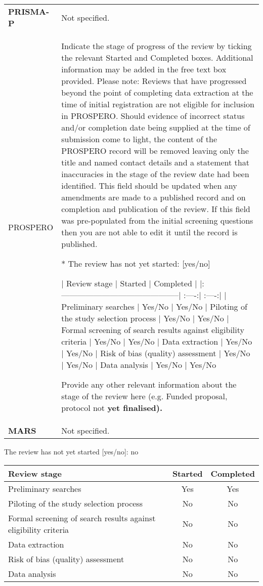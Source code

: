 \documentclass[
]{article}
\begin{document}
\hypertarget{sor}{}
\begin{collapse}

\begin{table}[H]
\centering
\begin{tabular}{>{}l|l}
\hline
\cellcolor[HTML]{ececec}{source} & \cellcolor[HTML]{ececec}{description}\\
\hline
\textbf{PRISMA-P} & Not specified.\\
\hline
PROSPERO & Indicate the stage of progress of the review by ticking the relevant Started and Completed boxes. Additional
information may be added in the free text box provided.
Please note: Reviews that have progressed beyond the point of completing data extraction at the time of
initial registration are not eligible for inclusion in PROSPERO. Should evidence of incorrect status and/or
completion date being supplied at the time of submission come to light, the content of the PROSPERO
record will be removed leaving only the title and named contact details and a statement that inaccuracies in
the stage of the review date had been identified.
This field should be updated when any amendments are made to a published record and on completion and
publication of the review. If this field was pre-populated from the initial screening questions then you are not
able to edit it until the record is published.

* The review has not yet started: [yes/no]

| Review stage | Started | Completed |
|:--------------------------------------------| :----:| :----:|
| Preliminary searches | Yes/No | Yes/No
| Piloting of the study selection process | Yes/No | Yes/No
| Formal screening of search results against eligibility criteria | Yes/No | Yes/No
| Data extraction | Yes/No | Yes/No
| Risk of bias (quality) assessment | Yes/No | Yes/No
| Data analysis | Yes/No | Yes/No

Provide any other relevant information about the stage of the review here (e.g. Funded proposal, protocol not
\textbf{yet finalised).}\\
\hline
\textbf{MARS} & Not specified.\\
\hline
\end{tabular}
\end{table}

\end{collapse}

The review has not yet started {[}yes/no{]}: no

\begin{longtable}[]{@{}lcc@{}}
\toprule
Review stage & Started & Completed\tabularnewline
\midrule
\endhead
Preliminary searches & Yes & Yes\tabularnewline
Piloting of the study selection process & No & No\tabularnewline
Formal screening of search results against eligibility criteria & No &
No\tabularnewline
Data extraction & No & No\tabularnewline
Risk of bias (quality) assessment & No & No\tabularnewline
Data analysis & No & No\tabularnewline
\bottomrule
\end{longtable}
\end{document}
